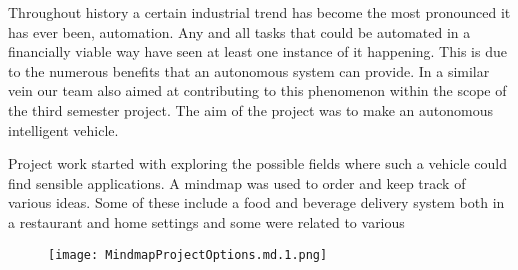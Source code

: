 \documentclass[../report.tex]{subfiles}
\begin{document}
    Throughout history a certain industrial trend has become the most pronounced 
    it has ever been, automation. Any and all tasks that could be automated in a
    financially viable way have seen at least one instance of it happening. This
    is due to the numerous benefits that an autonomous system can provide. In a
    similar vein our team also aimed at contributing to this phenomenon within 
    the scope of the third semester project. The aim of the project was to make
    an autonomous intelligent vehicle.

    Project work started with exploring the possible fields where such a vehicle
    could find sensible applications. A mindmap was used to order and keep track
    of various ideas. Some of these include a food and beverage delivery system
    both in a restaurant and home settings and some were related to various 

    \begin{figure}[H]
        \centering
        \texttt{[image: MindmapProjectOptions.md.1.png]}
    \end{figure}   
\end{document}

